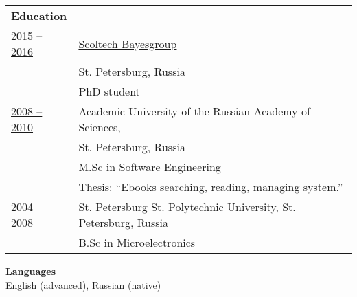 \documentclass[letterpaper,11pt,oneside]{article}
\begin{document}
\noindent \begin{tabular}{@{} l l}

\noindent \textbf{Education}  & \vspace{1em} \\

\underline{2015 -- 2016}     &  \hspace{10mm}\href{https://cs.hse.ru/en/bayesgroup/}{Scoltech Bayesgroup}   \\
                             &  \hspace{10mm}St. Petersburg, Russia  \\
                             &  \hspace{10mm}PhD student \vspace{1em} \\

\underline{2008 -- 2010}     &  \hspace{10mm}Academic University of the Russian Academy of Sciences,  \\
                             &  \hspace{10mm}St. Petersburg, Russia  \\
                             &  \hspace{10mm}M.Sc in Software Engineering  \\                             
                             &  \hspace{10mm}Thesis: “Ebooks searching, reading, managing system.”  \vspace{1em} \\                             

\underline{2004 -- 2008}     &  \hspace{10mm}St. Petersburg St. Polytechnic University, St. Petersburg, Russia   \\
                             &  \hspace{10mm}B.Sc in Microelectronics \vspace{1em} \\

\end{tabular}

\noindent \textbf{Languages} \vspace{1em} \\
\noindent English (advanced), Russian (native)
\end{document}
